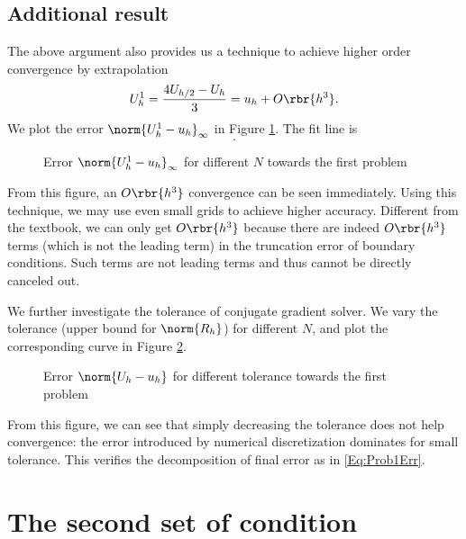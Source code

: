 \documentclass[english, nochinese]{pnote}
\newcommand\normi[1]{\norm{#1}_{\infty}}
\begin{document}
\subsection{Additional result}

The above argument also provides us a technique to achieve higher order convergence by extrapolation
\begin{equation} \label{Eq:Extra}
U_h^1 = \frac{ 4 U_{ h / 2 } - U_h }{3} = u_h + O \rbr{h^3}.
\end{equation}
We plot the error $ \normi{ U_h^1 - u_h } $ in Figure \ref{Fig:Prob1Extra}. The fit line is
\begin{equation}
.
\end{equation}

\begin{figure}[htbp]
\centering

\caption{Error $ \normi{ U_h^1 - u_h } $ for different $N$ towards the first problem}
\label{Fig:Prob1Extra}
\end{figure}

From this figure, an $ O \rbr{h^3} $ convergence can be seen immediately. Using this technique, we may use even small grids to achieve higher accuracy. Different from the textbook, we can only get $ O \rbr{h^3} $ because there are indeed $ O \rbr{h^3} $ terms (which is not the leading term) in the truncation error of boundary conditions. Such terms are not leading terms and thus cannot be directly canceled out.

We further investigate the tolerance of conjugate gradient solver. We vary the tolerance (upper bound for $\norm{R_h}$) for different $N$, and plot the corresponding curve in Figure \ref{Fig:Prob1Tol}.

\begin{figure}[htbp]
\centering

\caption{Error $ \norm{ U_h - u_h } $ for different tolerance towards the first problem}
\label{Fig:Prob1Tol}
\end{figure}

From this figure, we can see that simply decreasing the tolerance does not help convergence: the error introduced by numerical discretization dominates for small tolerance. This verifies the decomposition of final error as in \eqref{Eq:Prob1Err}.

\section{The second set of condition}
\end{document}
